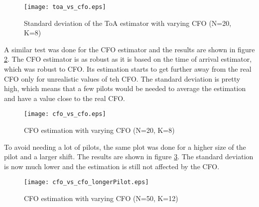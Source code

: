 \begin{figure}[H]
    \centering
    \texttt{[image: toa\_vs\_cfo.eps]}
    \caption{Standard deviation of the ToA estimator with varying CFO (N=20, K=8)}
    \label{fig:TOA_std_CFO}
\end{figure}

A similar test was done for the CFO estimator and the results are shown in figure \ref{fig:CFO_std_CFO}. The CFO estimator is as robust as it is based on the time of arrival estimator, which was robust to CFO. Its estimation starts to get further away from the real CFO only for unrealistic values of teh CFO. The standard deviation is pretty high, which means that a few pilots would be needed to average the estimation and have a value close to the real CFO. \\

\begin{figure}[H]
    \centering
    \texttt{[image: cfo\_vs\_cfo.eps]}
    \caption{CFO estimation with varying CFO (N=20, K=8)}
    \label{fig:CFO_std_CFO}
\end{figure}

To avoid needing a lot of pilots, the same plot was done for a higher size of the pilot and a larger shift. The results are shown in figure \ref{fig:CFO_std_CFO_N}. The standard deviation is now much lower and the estimation is still not affected by the CFO. \\

\begin{figure}[H]
    \centering
    \texttt{[image: cfo\_vs\_cfo\_longerPilot.eps]}
    \caption{CFO estimation with varying CFO (N=50, K=12)}
    \label{fig:CFO_std_CFO_N}
\end{figure}
